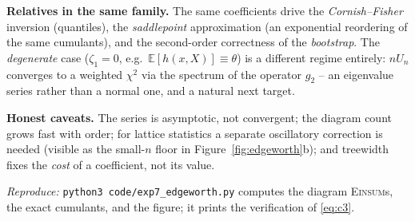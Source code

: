 \documentclass[11pt]{article}
\newcommand{\E}{\mathbb{E}}
\newcommand{\Einsum}{\textsc{Einsum}}
\newcommand{\F}[1]{\smallskip\noindent\textbf{\textsf{#1.}}\hspace{0.4em}}
\theoremstyle{plain}
\theoremstyle{definition}
\begin{document}
\F{Relatives in the same family} The same coefficients drive the
\emph{Cornish--Fisher} inversion (quantiles), the \emph{saddlepoint}
approximation (an exponential reordering of the same cumulants), and the
second-order correctness of the \emph{bootstrap}. The \emph{degenerate} case
($\zeta_1=0$, e.g.\ $\E[h(x,X)]\equiv\theta$) is a different regime entirely:
$n U_n$ converges to a weighted $\chi^2$ via the spectrum of the operator
$g_2$ -- an eigenvalue series rather than a normal one, and a natural next target.

\F{Honest caveats} The series is asymptotic, not convergent; the diagram count
grows fast with order; for lattice statistics a separate oscillatory correction
is needed (visible as the small-$n$ floor in Figure~\ref{fig:edgeworth}b); and
treewidth fixes the \emph{cost} of a coefficient, not its value.

\bigskip
\noindent\textit{Reproduce:} \texttt{python3 code/exp7\_edgeworth.py} computes the
diagram \Einsum{}s, the exact cumulants, and the figure; it prints the
verification of \eqref{eq:c3}.
\end{document}
